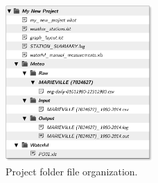 \documentclass[WHATMANUAL.tex]{subfiles}
\begin{document}
\begin{figure}[!ht]
\centering
\includegraphics[width=0.5\textwidth]{img/file_and_folder_architecture}
\caption[Project folder file organization.]{Project folder file organization.}
\label{fig:proFolder_organization}
\end{figure}

\FloatBarrier
\end{document}

